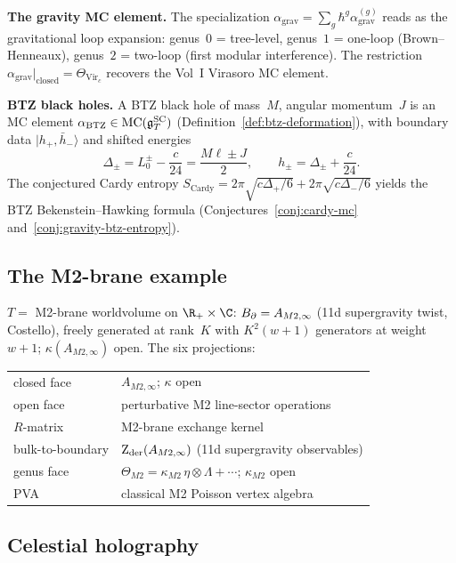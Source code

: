\medskip
\noindent\textbf{The gravity MC element.}\enspace
The specialization
$\alpha_{\mathrm{grav}} = \sum_g \hbar^g
\alpha_{\mathrm{grav}}^{(g)}$ reads as the gravitational loop
expansion: genus~$0$ = tree-level, genus~$1$ = one-loop
(Brown--Henneaux), genus~$2$ = two-loop (first modular
interference). The restriction
$\alpha_{\mathrm{grav}}|_{\text{closed}} =
\Theta_{\mathrm{Vir}_c}$ recovers the Vol~I Virasoro MC element.

\medskip
\noindent\textbf{BTZ black holes.}\enspace
A BTZ black hole of mass~$M$, angular momentum~$J$ is an MC element
$\alpha_{\mathrm{BTZ}} \in \operatorname{MC}(\mathfrak{g}^{\mathrm{SC}}_T)$
(Definition~\ref{def:btz-deformation}), with boundary data
$|h_+,\bar h_-\rangle$ and shifted energies
\[
\Delta_\pm=L_0^\pm-\frac{c}{24}=\frac{M\ell\pm J}{2},
\qquad
h_\pm=\Delta_\pm+\frac{c}{24}.
\]
The conjectured Cardy entropy
$S_{\mathrm{Cardy}} = 2\pi\sqrt{c\Delta_+/6} +
2\pi\sqrt{c\Delta_-/6}$ yields the BTZ Bekenstein--Hawking formula
(Conjectures~\ref{conj:cardy-mc} and~\ref{conj:gravity-btz-entropy}).


\subsection*{The M2-brane example}

$T = $ M2-brane worldvolume on $\R_+ \times \C$:
$B_{\partial} = A_{M2,\infty}$ (11d supergravity twist, Costello),
freely generated at rank~$K$ with $K^2(w{+}1)$ generators at
weight~$w{+}1$; $\kappa(A_{M2,\infty})$ open. The six
projections:
\begin{center}
\small
\renewcommand{\arraystretch}{1.15}
\begin{tabular}{ll}
closed face & $A_{M2,\infty}$; $\kappa$ open \\
open face & perturbative M2 line-sector operations \\
$R$-matrix & M2-brane exchange kernel \\
bulk-to-boundary & $\operatorname{Z}_{\mathrm{der}}(A_{M2,\infty})$
 (11d supergravity observables) \\
genus face & $\Theta_{M2} = \kappa_{M2}\,\eta\otimes\Lambda
 + \cdots$; $\kappa_{M2}$ open \\
PVA & classical M2 Poisson vertex algebra
\end{tabular}
\end{center}

\subsection*{Celestial holography}


